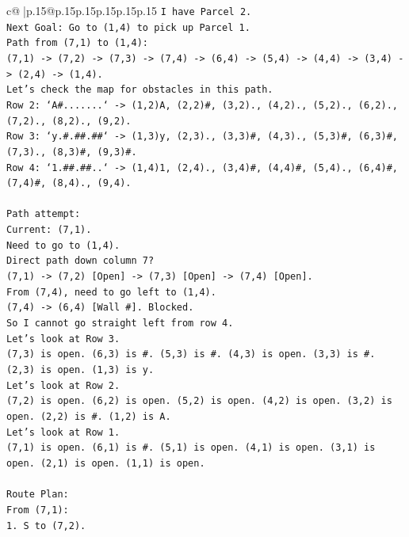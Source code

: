 \documentclass{article}
\begin{document}
{\begin{supertabular}{c@{$\;$}|p{.15\linewidth}@{}p{.15\linewidth}p{.15\linewidth}p{.15\linewidth}p{.15\linewidth}p{.15\linewidth}}
{{{\texttt{I have Parcel 2.} \\
\texttt{Next Goal: Go to (1,4) to pick up Parcel 1.} \\
\texttt{Path from (7,1) to (1,4):} \\
\texttt{(7,1) {-}> (7,2) {-}> (7,3) {-}> (7,4) {-}> (6,4) {-}> (5,4) {-}> (4,4) {-}> (3,4) {-}> (2,4) {-}> (1,4).} \\
\texttt{Let's check the map for obstacles in this path.} \\
\texttt{Row 2: `A\#.......` {-}> (1,2)A, (2,2)\#, (3,2)., (4,2)., (5,2)., (6,2)., (7,2)., (8,2)., (9,2).} \\
\texttt{Row 3: `y.\#.\#\#.\#\#` {-}> (1,3)y, (2,3)., (3,3)\#, (4,3)., (5,3)\#, (6,3)\#, (7,3)., (8,3)\#, (9,3)\#.} \\
\texttt{Row 4: `1.\#\#.\#\#..` {-}> (1,4)1, (2,4)., (3,4)\#, (4,4)\#, (5,4)., (6,4)\#, (7,4)\#, (8,4)., (9,4).} \\
\\ 
\texttt{Path attempt:} \\
\texttt{Current: (7,1).} \\
\texttt{Need to go to (1,4).} \\
\texttt{Direct path down column 7?} \\
\texttt{(7,1) {-}> (7,2) {[}Open{]} {-}> (7,3) {[}Open{]} {-}> (7,4) {[}Open{]}.} \\
\texttt{From (7,4), need to go left to (1,4).} \\
\texttt{(7,4) {-}> (6,4) {[}Wall \#{]}. Blocked.} \\
\texttt{So I cannot go straight left from row 4.} \\
\texttt{Let's look at Row 3.} \\
\texttt{(7,3) is open. (6,3) is \#. (5,3) is \#. (4,3) is open. (3,3) is \#. (2,3) is open. (1,3) is y.} \\
\texttt{Let's look at Row 2.} \\
\texttt{(7,2) is open. (6,2) is open. (5,2) is open. (4,2) is open. (3,2) is open. (2,2) is \#. (1,2) is A.} \\
\texttt{Let's look at Row 1.} \\
\texttt{(7,1) is open. (6,1) is \#. (5,1) is open. (4,1) is open. (3,1) is open. (2,1) is open. (1,1) is open.} \\
\\ 
\texttt{Route Plan:} \\
\texttt{From (7,1):} \\
\texttt{1. S to (7,2).} \\
}}}
\end{supertabular}}
\end{document}
